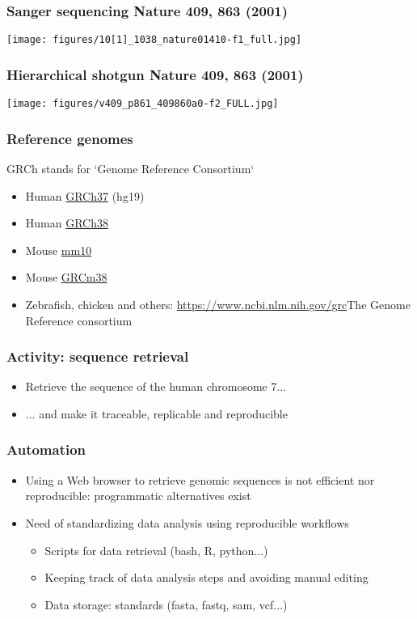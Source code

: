 \documentclass{beamer}
\begin{document}
\begin{frame}
  \frametitle{Sanger sequencing Nature 409, 863 (2001)}
\centering
\texttt{[image: figures/10[1]\_1038\_nature01410-f1\_full.jpg]}
\end{frame}

\begin{frame}
  \frametitle{Hierarchical shotgun Nature 409, 863 (2001)}
\centering
\texttt{[image: figures/v409\_p861\_409860a0-f2\_FULL.jpg]}
\end{frame}



\begin{frame}
  \frametitle{Reference genomes}
  GRCh stands for `Genome Reference Consortium`
  \begin{itemize}
  \item Human \href{https://www.ncbi.nlm.nih.gov/assembly/GCF_000001405.13/}{GRCh37} (hg19)
  \item Human \href{https://www.ncbi.nlm.nih.gov/assembly/GCF_000001405.38}{GRCh38}
  \item Mouse \href{https://www.ncbi.nlm.nih.gov/assembly/GCF_000001635.20/}{mm10}
  \item Mouse \href{https://www.ncbi.nlm.nih.gov/assembly/GCF_000001635.26}{GRCm38}

  \item Zebrafish, chicken and others: \url{https://www.ncbi.nlm.nih.gov/grc}{The Genome Reference consortium}

  \end{itemize}
\end{frame}



\begin{frame}
  \frametitle{Activity: sequence retrieval}
  \begin{itemize}
  \item Retrieve the sequence of the human chromosome 7...
  \item ... and make it traceable, replicable and reproducible
  \end{itemize}
\end{frame}


\begin{frame}
  \frametitle{Automation}
  \begin{itemize}
  \item Using a Web browser to retrieve genomic sequences is not efficient nor reproducible: programmatic alternatives exist
  \item Need of standardizing data analysis using reproducible workflows
    \begin{itemize}

    \item Scripts for data retrieval (bash, R, python...)
    \item Keeping track of data analysis steps and avoiding manual editing
    \item Data storage: standards (fasta, fastq, sam, vcf...)
    \end{itemize}
  \end{itemize}
\end{frame}
\end{document}
